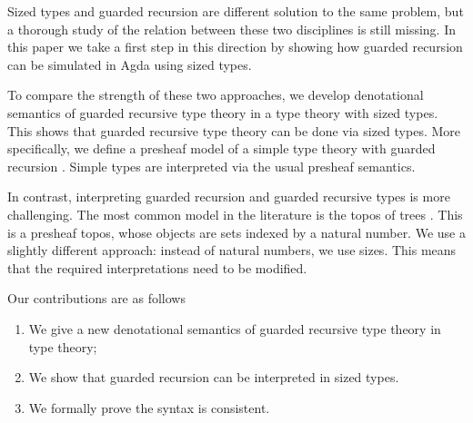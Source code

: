 



Sized types and guarded recursion are different solution to the same
problem, but a thorough study of the relation between these two
disciplines is still missing. In this paper we take a first step in
this direction by showing how guarded recursion can be simulated in
Agda using sized types. 



To compare the strength of these two approaches, we develop denotational semantics of guarded recursive type theory in a type theory with sized types.
This shows that guarded recursive type theory can be done via sized types.
More specifically, we define a presheaf model of a simple type theory with guarded recursion \cite{BMSS-synthetic}.
Simple types are interpreted via the usual presheaf semantics.

In contrast, interpreting guarded recursion and guarded recursive types is more challenging.
The most common model in the literature is the topos of trees \cite{BMSS-synthetic}.
This is a presheaf topos, whose objects are sets indexed by a natural number.
We use a slightly different approach: instead of natural numbers, we use sizes.
This means that the required interpretations need to be modified.

Our contributions are as follows
\begin{enumerate}
	\item We give a new denotational semantics of guarded recursive type theory in type theory;
	\item We show that guarded recursion can be interpreted in sized types.
	\item We formally prove the syntax is consistent.
\end{enumerate}

